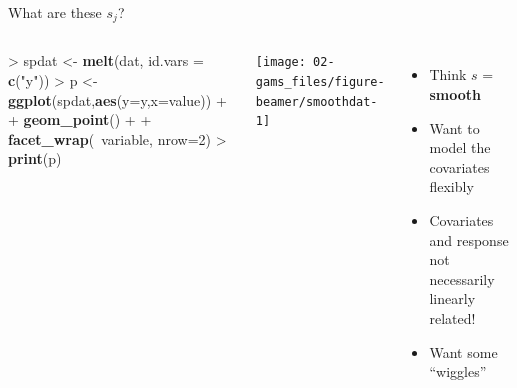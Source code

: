 \documentclass[10pt,ignorenonframetext,compress, aspectratio=169]{beamer}
\newenvironment{Shaded}{\begin{snugshade}}{\end{snugshade}}
\newcommand{\KeywordTok}[1]{\textcolor[rgb]{0.13,0.29,0.53}{\textbf{{#1}}}}
\newcommand{\DataTypeTok}[1]{\textcolor[rgb]{0.13,0.29,0.53}{{#1}}}
\newcommand{\DecValTok}[1]{\textcolor[rgb]{0.00,0.00,0.81}{{#1}}}
\newcommand{\StringTok}[1]{\textcolor[rgb]{0.31,0.60,0.02}{{#1}}}
\newcommand{\NormalTok}[1]{{#1}}
\providecommand{\tightlist}{%
  \setlength{\itemsep}{0pt}\setlength{\parskip}{0pt}}
\newcommand{\columnsbegin}{\begin{columns}}
\newcommand{\columnsend}{\end{columns}}
\begin{document}
\begin{frame}[fragile]{What are these \(s_j\)?}

\columnsbegin
{}

\begin{Shaded}
\begin{Highlighting}[]
\NormalTok{>}\StringTok{ }\NormalTok{spdat <-}\StringTok{ }\KeywordTok{melt}\NormalTok{(dat, }\DataTypeTok{id.vars =} \KeywordTok{c}\NormalTok{(}\StringTok{"y"}\NormalTok{))}
\NormalTok{>}\StringTok{ }\NormalTok{p <-}\StringTok{ }\KeywordTok{ggplot}\NormalTok{(spdat,}\KeywordTok{aes}\NormalTok{(}\DataTypeTok{y=}\NormalTok{y,}\DataTypeTok{x=}\NormalTok{value)) +}
\NormalTok{+}\StringTok{       }\KeywordTok{geom_point}\NormalTok{() +}
\NormalTok{+}\StringTok{       }\KeywordTok{facet_wrap}\NormalTok{(~variable, }\DataTypeTok{nrow=}\DecValTok{2}\NormalTok{)}
\NormalTok{>}\StringTok{ }\KeywordTok{print}\NormalTok{(p)}
\end{Highlighting}
\end{Shaded}

\begin{center}\texttt{[image: 02-gams\_files/figure-beamer/smoothdat-1]} \end{center}


\begin{itemize}
\tightlist
\item
  Think \(s\) = \textbf{smooth}
\item
  Want to model the covariates flexibly
\item
  Covariates and response not necessarily linearly related!
\item
  Want some ``wiggles''
\end{itemize}

\columnsend

\end{frame}
\end{document}
